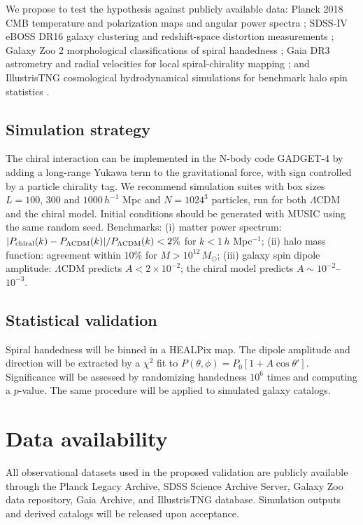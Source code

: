 \documentclass[a4paper,10pt]{article}
\begin{document}
We propose to test the hypothesis against publicly available data:
Planck 2018 CMB temperature and polarization maps and angular power spectra
\cite{planck18}; SDSS-IV eBOSS DR16 galaxy clustering and redshift-space
distortion measurements \cite{sdss}; Galaxy Zoo 2 morphological
classifications of spiral handedness \cite{galaxyzoo}; Gaia DR3 astrometry and
radial velocities for local spiral-chirality mapping \cite{gaia}; and
IllustrisTNG cosmological hydrodynamical simulations for benchmark halo spin
statistics \cite{illustris,illustris2}.

\subsection{Simulation strategy}

The chiral interaction can be implemented in the N-body code GADGET-4
\cite{gadget4} by adding a long-range Yukawa term to the gravitational force,
with sign controlled by a particle chirality tag. We recommend simulation
suites with box sizes $L=100$, $300$ and $1000\,h^{-1}$ Mpc and $N=1024^3$
particles, run for both $\Lambda$CDM and the chiral model. Initial conditions
should be generated with MUSIC \cite{music} using the same random seed.
Benchmarks:
(i) matter power spectrum:
$|P_{\rm chiral}(k)-P_{\Lambda\rm CDM}(k)|/P_{\Lambda\rm CDM}(k)<2\%$ for
$k<1\,h$ Mpc$^{-1}$;
(ii) halo mass function: agreement within $10\%$ for
$M>10^{12}\,M_\odot$;
(iii) galaxy spin dipole amplitude: $\Lambda$CDM predicts $A<2\times10^{-2}$;
the chiral model predicts $A\sim10^{-2}$--$10^{-3}$.

\subsection{Statistical validation}

Spiral handedness will be binned in a HEALPix map. The dipole amplitude and
direction will be extracted by a $\chi^2$ fit to
$P(\theta,\phi)=P_0[1+A\cos\theta']$. Significance will be assessed by
randomizing handedness $10^6$ times and computing a $p$-value. The same
procedure will be applied to simulated galaxy catalogs.

\section{Data availability}

All observational datasets used in the proposed validation are publicly
available through the Planck Legacy Archive, SDSS Science Archive Server,
Galaxy Zoo data repository, Gaia Archive, and IllustrisTNG database.
Simulation outputs and derived catalogs will be released upon acceptance.
\end{document}
